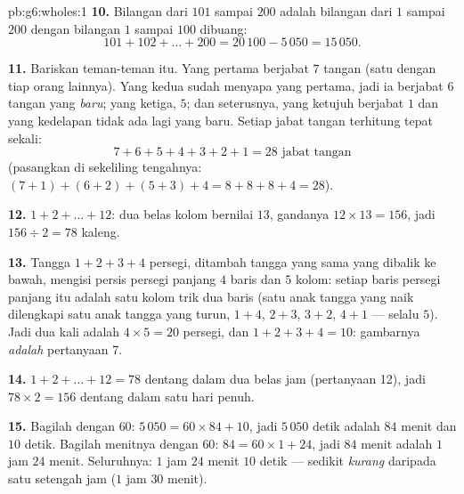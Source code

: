 \begin{solution}{pb:g6:wholes:1}
\textbf{10.} Bilangan dari $101$ sampai $200$ adalah bilangan dari
$1$ sampai $200$ dengan bilangan $1$ sampai $100$ dibuang:
\[
101 + 102 + \dots + 200 = 20\,100 - 5\,050 = 15\,050 .
\]

\textbf{11.} Bariskan teman-teman itu. Yang pertama berjabat $7$
tangan (satu dengan tiap orang lainnya). Yang kedua sudah menyapa
yang pertama, jadi ia berjabat $6$ tangan yang \emph{baru}; yang
ketiga, $5$; dan seterusnya, yang ketujuh berjabat $1$ dan yang
kedelapan tidak ada lagi yang baru. Setiap jabat tangan terhitung
tepat sekali:
\[
7 + 6 + 5 + 4 + 3 + 2 + 1 = 28 \text{ jabat tangan}
\]
(pasangkan di sekeliling tengahnya: $(7+1) + (6+2) + (5+3) + 4 =
8 + 8 + 8 + 4 = 28$).

\textbf{12.} $1 + 2 + \dots + 12$: dua belas kolom bernilai $13$,
 gandanya $12 \times 13 = 156$, jadi
$156 \div 2 = 78$ kaleng.

\textbf{13.} Tangga $1 + 2 + 3 + 4$ persegi, ditambah tangga yang
sama yang dibalik ke bawah, mengisi persis persegi panjang $4$ baris
dan $5$ kolom: setiap baris persegi panjang itu adalah satu kolom
trik dua baris (satu anak tangga yang naik dilengkapi satu anak
tangga yang turun, $1 + 4$, $2 + 3$, $3 + 2$, $4 + 1$ --- selalu
$5$). Jadi dua kali  adalah $4 \times 5 = 20$ persegi, dan
$1 + 2 + 3 + 4 = 10$: gambarnya \emph{adalah} pertanyaan 7.

\textbf{14.} $1 + 2 + \dots + 12 = 78$ dentang dalam dua belas jam
(pertanyaan 12), jadi $78 \times 2 = 156$ dentang dalam satu hari penuh.

\textbf{15.} Bagilah dengan $60$: $5\,050 = 60 \times 84 + 10$, jadi
$5\,050$ detik adalah $84$ menit dan $10$ detik. Bagilah menitnya
dengan $60$: $84 = 60 \times 1 + 24$, jadi $84$ menit adalah
$1$ jam $24$ menit. Seluruhnya: $1$ jam $24$ menit $10$ detik ---
sedikit \emph{kurang} daripada satu setengah jam ($1$ jam $30$ menit).

\end{solution}
